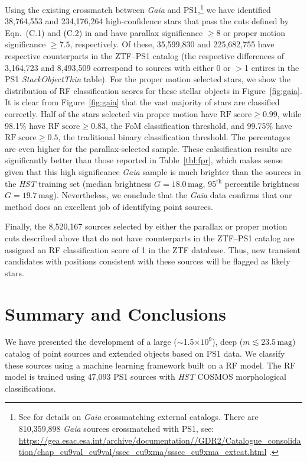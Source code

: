 \documentclass[twocolumn]{aastex62}
\begin{document}
\begin{CJK*}{UTF8}{gbsn}
Using the existing crossmatch between \textit{Gaia} and PS1,\footnote{See
\citet{Marrese17} for details on \textit{Gaia} crossmatching external
catalogs. There are 810,359,898 \textit{Gaia} sources crossmatched with PS1,
see:
%
\url{https://gea.esac.esa.int/archive/documentation//GDR2/Catalogue_consolidation/chap_cu9val_cu9val/ssec_cu9xma/sssec_cu9xma_extcat.html}
%
.} we have identified 38,764,553 and 234,176,264 high-confidence stars that
pass the cuts defined by Eqn.~(C.1) and (C.2) in \citet{Lindegren18} and
have parallax significance $\ge 8$ or proper motion significance $\ge 7.5$,
respectively. Of these, 35,599,830 and 225,682,755 have respective
counterparts in the ZTF--PS1 catalog (the respective differences of
3,164,723 and 8,493,509 correspond to sources with either 0 or $>$1 entires
in the PS1 \textit{StackObjectThin} table). For the proper motion selected
stars, we show the distribution of RF classification scores for these
stellar objects in Figure~\ref{fig:gaia}. It is clear from
Figure~\ref{fig:gaia} that the vast majority of stars are classified
correctly. Half of the stars selected via proper motion have
$\mathrm{RF\;score}\ge 0.99$, while 98.1\% have $\mathrm{RF\;score}\ge
0.83$, the FoM classification threshold, and 99.75\% have
$\mathrm{RF\;score}\ge 0.5$, the traditional binary classification
threshold. The percentages are even higher for the parallax-selected sample.
These calssification results are significantly better than those reported in
Table~\ref{tbl:fpr}, which makes sense given that this high significance
\textit{Gaia} sample is much brighter than the sources in the \textit{HST}
training set (median brightness $G = 18.0\,\mathrm{mag}$, 95$^\mathrm{th}$
percentile brightness $G = 19.7\,\mathrm{mag}$). Nevertheless, we conclude
that the \textit{Gaia} data confirms that our method does an excellent job
of identifying point sources.

Finally, the 8,520,167 sources selected by either the parallax or proper
motion cuts described above that do not have counterparts in the ZTF--PS1
catalog are assigned an RF classification score of 1 in the ZTF database.
Thus, new transient candidates with positions consistent with these sources
will be flagged as likely stars.

\section{Summary and Conclusions}

We have presented the development of a large ($\sim$1.5$\times 10^{9}$),
deep ($m \lesssim 23.5\,\mathrm{mag}$) catalog of point sources and extended
objects based on PS1 data. We classify these sources using a machine
learning framework built on a RF model. The RF model is trained using 47,093
PS1 sources with \textit{HST} COSMOS morphological classifications.


\end{CJK*}
\end{document}
